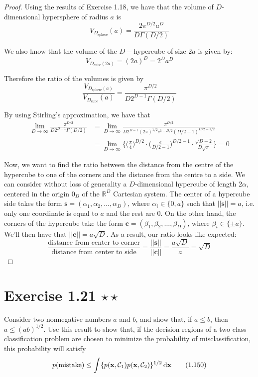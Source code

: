 \begin{proof}
    Using the results of Exercise 1.18, we have that the volume of 
    $D$-dimensional hypersphere of radius $a$ is 
    \[
        V_{D_{\text{sphere}}}(a) = \frac{2\pi^{D/2} a^D}{D\Gamma(D/2)}
    \] 

    We also know that the volume of the $D-$hypercube of size $2a$ 
    is given by:
    \[
        V_{D_{\text{cube}}(2a)} = (2a)^D = 2^D a^D
    \] 

    Therefore the ratio of the volumes is given by
    \begin{equation*}\tag{1.145}
        \frac{V_{D_{\text{sphere}}(a)}}{V_{D_{\text{cube}}}(a)} = \frac{\pi^{D/2}}{D 2^{D - 1}\Gamma(D/2)}
    \end{equation*}

    By using Stirling's approximation, we have that
    \begin{align*}
    \lim_{D \to \infty} \frac{\pi^{D/2}}{D 2^{D - 1}\Gamma(D/2)}
    &= \lim_{D \to \infty} \frac{\pi^{D/2}}{D 2^{D - 1} (2\pi)^{1/2}e^{1 - D/2} (D/2 - 1)^{D/2 - 1/2}} \\
    &= \lim_{D \to \infty} \bigg\{\bigg(\frac{\pi}{4}\bigg)^{D/2} \cdot \bigg(\frac{e}{D/2 - 1}\bigg)^{D/2 - 1} \cdot \frac{\sqrt{D - 2}}{D\sqrt{\pi}}\bigg\} = 0
    \end{align*}

    Now, we want to find the ratio between the distance from the centre of the hypercube to one
    of the corners and the distance from the centre to a side. We can consider without loss of 
    generality a $D$-dimensional hypercube of length $2\alpha$, centered in the origin $0_D$ of the 
    $\mathbb{R}^D$ Cartesian system. The center of a hypercube side takes the form 
    $\mathbf{s} = (\alpha_1, \alpha_2, \ldots, \alpha_D)$, where $\alpha_i \in \{0, a\}$ such 
    that $||\mathbf{s}|| = a$, i.e. only one coordinate is equal to $a$ and the rest are $0$. 
    On the other hand, the corners of the hypercube take the 
    form $\mathbf{c} = (\beta_1, \beta_2, \ldots, \beta_D)$, where $\beta_i \in \{\pm a\}$.
    We'll then have that $||\mathbf{c}|| = a\sqrt{D}$. As a result, our ratio looks like expected:
    \[
        \frac{\text{distance from center to corner}}{\text{distance from center to side}} 
        = \frac{||\mathbf{s}||}{||\mathbf{c}||} = \frac{a\sqrt{D}}{a} = \sqrt{D}
    \] 
\end{proof}

\section*{Exercise 1.21 $\star \star$}
Consider two nonnegative numbers $a$ and $b$, and show that, if $a \leq b$, then
$a \leq (ab)^{1/2}$. Use this result to show that, if the decision regions of a two-class
classification problem are chosen to minimize the probability of misclassification,
this probability will satisfy
\begin{equation*}
    p(\text{mistake}) \leq \int \{p(\mathbf{x}, \mathcal{C}_1)p(\mathbf{x}, \mathcal{C}_2)\}^{1/2} 
    \mathop{}\!\mathrm{d} \mathbf{x}
    \tag{1.150}\label{eq:1.150}
\end{equation*}


